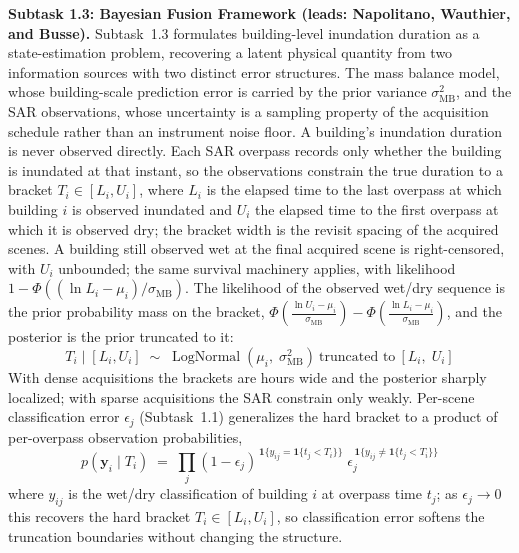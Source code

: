\documentclass[11pt]{article}
\begin{document}
\textbf{Subtask 1.3: Bayesian Fusion Framework (leads: Napolitano, Wauthier,
and Busse).}
Subtask~1.3 formulates building-level inundation duration as a state-estimation
problem, recovering a latent physical quantity from two information sources with
two distinct error structures. The mass balance model, whose building-scale
prediction error is
carried by the prior variance $\sigma_{\mathrm{MB}}^2$, and the SAR observations,
whose uncertainty is a sampling property of the acquisition schedule rather than
an instrument noise floor.
A building's inundation duration is never observed directly. Each SAR overpass
records only whether the building is inundated at that instant, so the
observations constrain the true duration to a bracket $T_i \in [L_i, U_i]$, where $L_i$ is the elapsed time to the last overpass at which building $i$ is
observed inundated and $U_i$ the elapsed time to the first overpass at which it
is observed dry; the bracket width is the revisit spacing of the acquired scenes.
A building still observed wet at the final acquired scene is right-censored, with
$U_i$ unbounded; the same survival machinery applies, with likelihood
$1 - \Phi\!\left((\ln L_i - \mu_i)/\sigma_{\mathrm{MB}}\right)$.
The likelihood of the observed wet/dry sequence is the prior probability mass on
the bracket,
$\Phi\!\left(\tfrac{\ln U_i - \mu_i}{\sigma_{\mathrm{MB}}}\right) -
 \Phi\!\left(\tfrac{\ln L_i - \mu_i}{\sigma_{\mathrm{MB}}}\right)$,
and the posterior is the prior truncated to it:
\begin{equation}\label{eq:posterior}
  T_i \mid [L_i, U_i] \;\sim\;
  \operatorname{LogNormal}(\mu_i,\; \sigma_{\mathrm{MB}}^2)
  \ \text{truncated to}\ [L_i,\; U_i]
\end{equation}
With dense acquisitions the brackets are hours wide and the posterior sharply
localized; with sparse acquisitions the SAR constrain only weakly.
Per-scene classification error $\epsilon_j$ (Subtask~1.1) generalizes the hard
bracket to a product of per-overpass observation probabilities,
\begin{equation}\label{eq:softbracket}
  p(\bm{y}_i \mid T_i) \;=\; \prod_{j}
  (1-\epsilon_j)^{\,\mathbf{1}\{y_{ij} = \mathbf{1}\{t_j < T_i\}\}}\;
  \epsilon_j^{\,\mathbf{1}\{y_{ij} \neq \mathbf{1}\{t_j < T_i\}\}}
\end{equation}
where $y_{ij}$ is the wet/dry classification of building $i$ at overpass time
$t_j$; as $\epsilon_j \to 0$ this recovers the hard bracket $T_i \in [L_i, U_i]$, so classification error softens the truncation
boundaries without changing the structure.
\end{document}
